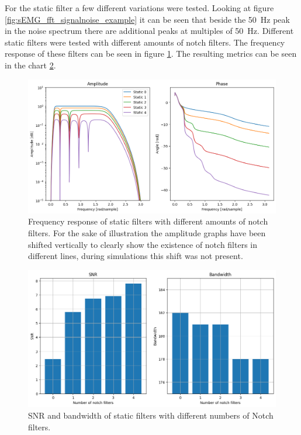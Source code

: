 For the static filter a few different variations were tested. Looking at figure \ref{fig:sEMG_fft_signalnoise_example} it can be seen that beside the \SI{50}{\hertz} peak in the noise spectrum there are additional peaks at multiples of \SI{50}{\hertz}. Different static filters were tested with different amounts of notch filters. The frequency response of these filters can be seen in figure \ref{fig:staticfilter_notches_frequencyresponse}. The resulting metrics can be seen in the chart  \ref{fig:staticfilter_notches_barchart}.

\begin{figure}[h!t]
	\begin{center}
		\includegraphics[width=1.0\columnwidth]{images/staticfilter_notches_frequencyresponse.png}
	\end{center}
	\caption{Frequency response of static filters with different amounts of notch filters. For the sake of illustration the amplitude graphs have been shifted vertically to clearly show the existence of notch filters in different lines, during simulations this shift was not present. }
	\label{fig:staticfilter_notches_frequencyresponse}
\end{figure}

\begin{figure}[h!t]
	\begin{center}
		\includegraphics[width=1.0\columnwidth]{images/staticfilter_notches_barchart.png}
	\end{center}
	\caption{SNR and bandwidth of static filters with different numbers of Notch filters. }
	\label{fig:staticfilter_notches_barchart}
\end{figure}


